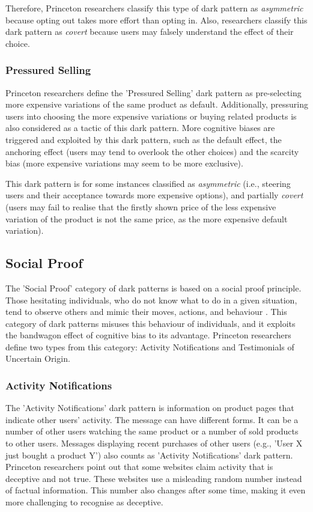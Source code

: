         Therefore, Princeton researchers classify this type of dark pattern as \emph{asymmetric} because opting out takes more effort than opting in. Also, researchers classify this dark pattern as \emph{covert} because users may falsely understand the effect of their choice.
        \subsubsection{Pressured Selling}
        Princeton researchers define the 'Pressured Selling' dark pattern as pre-selecting more expensive variations of the same product as default. Additionally, pressuring users into choosing the more expensive variations or buying related products is also considered as a tactic of this dark pattern. More cognitive biases are triggered and exploited by this dark pattern, such as the default effect, the anchoring effect (users may tend to overlook the other choices) and the scarcity bias (more expensive variations may seem to be more exclusive).  
        
        This dark pattern is for some instances classified as \emph{asymmetric} (i.e., steering users and their acceptance towards more expensive options), and partially \emph{covert} (users may fail to realise that the firstly shown price of the less expensive variation of the product is not the same price, as the more expensive default variation).
    \subsection{Social Proof}
    The 'Social Proof' category of dark patterns is based on a social proof principle. Those hesitating individuals, who do not know what to do in a given situation, tend to observe others and mimic their moves, actions, and behaviour \cite{influence-cialdini, evilbydesign}. This category of dark patterns misuses this behaviour of individuals, and it exploits the bandwagon effect of cognitive bias to its advantage. Princeton researchers define two types from this category: Activity Notifications and Testimonials of Uncertain Origin.

        \subsubsection{Activity Notifications}
        The 'Activity Notifications' dark pattern is information on product pages that indicate other users' activity. The message can have different forms. It can be a number of other users watching the same product or a number of sold products to other users. Messages displaying recent purchases of other users (e.g., 'User X just bought a product Y') also counts as 'Activity Notifications' dark pattern. Princeton researchers point out that some websites claim activity that is deceptive and not true. These websites use a misleading random number instead of factual information. This number also changes after some time, making it even more challenging to recognise as deceptive. 
        
